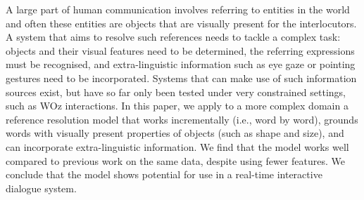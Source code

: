 A large part of human communication involves referring to entities in the world and often these entities are objects that are visually present for the interlocutors. A system that aims to resolve such references needs to tackle a complex task: objects and their visual features need to be determined, the referring expressions must be recognised, and extra-linguistic information such as eye gaze or pointing gestures need to be incorporated. Systems that can make use of such information sources exist, but have so far only been tested under very constrained settings, such as WOz interactions. In this paper, we apply to a more complex domain a reference resolution model that works incrementally (i.e., word by word), grounds words with visually present properties of objects (such as shape and size), and can incorporate extra-linguistic information. We find that the model works well compared to previous work on the same data, despite using fewer features. We conclude that the model shows potential for use in a real-time interactive dialogue system.
